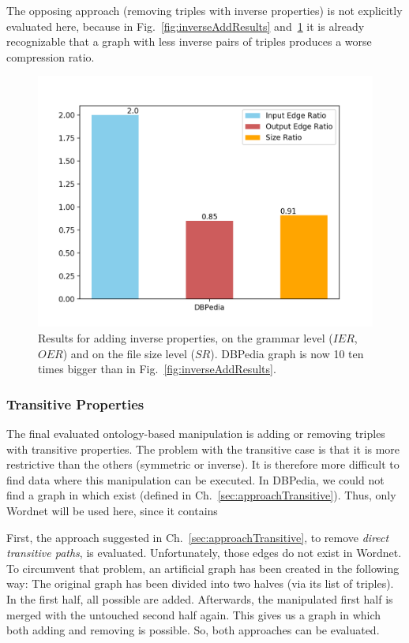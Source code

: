 The opposing approach (removing triples with inverse properties) is not explicitly evaluated here, because in Fig.~\ref{fig:inverseAddResults} and~\ref{fig:inverseAddResultsBigger} it is already recognizable that a graph with less inverse pairs of triples produces a worse compression ratio.

\begin{figure}
	\centering
	\includegraphics[width=0.8\linewidth]{figures/4_evaluation/ontology/ratiosInverseAddBigger}
	\caption{Results for adding inverse properties, on the grammar level ($IER$, $OER$) and on the file size level ($SR$). DBPedia graph is now 10 ten times bigger than in Fig.~\ref{fig:inverseAddResults}.}
	\label{fig:inverseAddResultsBigger}
\end{figure}


\subsubsection{Transitive Properties}

The final evaluated ontology-based manipulation is adding or removing triples with transitive properties. The problem with the transitive case is that it is more restrictive than the others (symmetric or inverse). It is therefore more difficult to find data where this manipulation can be executed. In DBPedia, we could not find a graph in which \tps exist (defined in Ch.~\ref{sec:approachTransitive}). Thus, only Wordnet will be used here, since it contains \tpsp

First, the approach suggested in Ch.~\ref{sec:approachTransitive}, to remove \textit{direct transitive paths}, is evaluated. Unfortunately, those edges do not exist in Wordnet. To circumvent that problem, an artificial graph has been created in the following way:  The original graph has been divided into two halves (via its list of triples). In the first half, all possible \dtps are added. Afterwards, the manipulated first half is merged with the untouched second half again. This gives us a graph in which both adding and removing \dtps is possible. So, both approaches can be evaluated.

